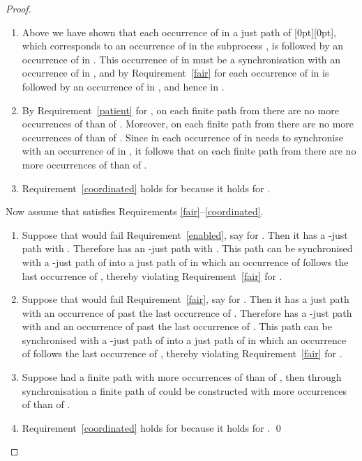 \documentclass[smallcondensed]{svjour3}
\newcommand{\plat}[1]{\raisebox{0pt}[0pt][0pt]{#1}}  \def\precond#1{{\vphantom{#1}}^\bullet #1}
\newcommand{\Def}[1]{Definition~\ref{df:#1}}
\begin{document}
\begin{proof}
\begin{enumerate}
  So assume, towards a contradiction, that on a just path  of \plat{} an
  occurrence of  is not followed by an occurrence of  in the subprocess .
  By \Def{just path}  must be -just for some .
  So  can be decomposed into an -just path  of , a -just path  of
   and a -just path  of  for certain . By assumption, .
  Moreover,  can be decomposed into an -just path  of .
  Since in \plat{} the  of  requires synchronisation with the
   of , and  has only finitely many occurrences of ,
  it follows that  has only finitely many occurrences of , and thus that
   has only finitely many occurrences of .
  Since  satisfies Requirement~\ref{enabled}, saying that the system will always
  return to a state where it remains ready to accept the next request  until it arrives,
  . Hence .
  By \Def{just path}, this contradicts the justness of .
\item Above we have shown that each occurrence of  in a just path of
  \plat{}, which corresponds to an occurrence of  in the subprocess , is followed by
  an occurrence of  in . This occurrence of  in  must be a
  synchronisation with an occurrence of  in , and by Requirement~\ref{fair} for  each
  occurrence of  in  is followed by an occurrence of  in , and hence in .
\item By Requirement~\ref{patient} for , on each finite path from  there are no more
  occurrences of  than of . Moreover, on each finite path from  there are no more
  occurrences of  than of . Since in  each occurrence of  in  needs to
  synchronise with an occurrence of   in , it follows that on each finite path from
    there are no more occurrences of  than of .
\item Requirement~\ref{coordinated} holds for  because it holds for .
\end{enumerate}
Now assume that  satisfies Requirements \ref{fair}--\ref{coordinated}.
\begin{enumerate}
\item Suppose that  would fail Requirement~\ref{enabled}, say for . Then it has a -just
  path with . Therefore  has an -just path with .
  This path can be synchronised with a -just path of  into a just path of 
  in which an occurrence of  follows the last occurrence of , thereby violating
  Requirement~\ref{fair} for .
\item Suppose that  would fail Requirement~\ref{fair}, say for . Then it has a just
  path with an occurrence of  past the last occurrence of . Therefore  has a -just
  path with  and an occurrence of  past the last occurrence of .
  This path can be synchronised with a -just path of  into a just path of 
  in which an occurrence of  follows the last occurrence of , thereby violating
  Requirement~\ref{fair} for .
\item Suppose  had a finite path with more occurrences of  than of , then through
  synchronisation a finite path of  could be constructed with more occurrences of  than of .
\item Requirement~\ref{coordinated} holds for  because it holds for .
\qed
\end{enumerate}
\end{proof}
\end{document}
